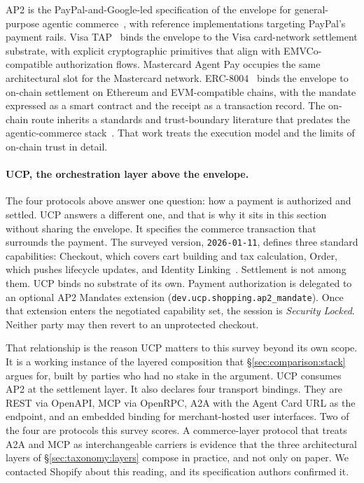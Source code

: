 AP2 is the PayPal-and-Google-led specification of the
envelope for general-purpose agentic
commerce~\cite{spec_ap2}, with reference implementations
targeting PayPal's payment rails. Visa TAP~\cite{spec_visa_tap}
binds the envelope to the Visa card-network settlement
substrate, with explicit cryptographic primitives that
align with EMVCo-compatible authorization flows.
Mastercard Agent Pay occupies the same architectural slot
for the Mastercard network. ERC-8004~\cite{spec_erc8004}
binds the envelope to on-chain settlement on Ethereum and
EVM-compatible chains, with the mandate expressed as a
smart contract and the receipt as a transaction record.
The on-chain route inherits a standards and trust-boundary
literature that predates the agentic-commerce
stack~\cite{agents_blockchain}. That work treats the
execution model and the limits of on-chain trust in detail.

\paragraph{UCP, the orchestration layer above the
envelope.} The four protocols above answer one question:
how a payment is authorized and settled. UCP answers a
different one, and that is why it sits in this section
without sharing the envelope. It specifies the commerce
transaction that surrounds the payment. The surveyed
version, \texttt{2026-01-11}, defines three standard
capabilities: Checkout, which covers cart building and tax
calculation, Order, which pushes lifecycle updates, and
Identity Linking~\cite{spec_ucp}. Settlement is not among
them. UCP binds no substrate of its own. Payment
authorization is delegated to an optional AP2 Mandates
extension (\texttt{dev.ucp.shopping.ap2\_mandate}). Once that
extension enters the negotiated capability set, the session is
\emph{Security Locked}. Neither party may then revert to an
unprotected checkout.

That relationship is the reason UCP matters to this
survey beyond its own scope. It is a working instance of
the layered composition that \S\ref{sec:comparison:stack}
argues for, built by parties who had no stake in the
argument. UCP consumes AP2 at the settlement layer. It
also declares four transport bindings. They are REST via
OpenAPI, MCP via OpenRPC, A2A with the Agent Card URL as the
endpoint, and an embedded binding for merchant-hosted user
interfaces. Two of the four are protocols this survey scores.
A commerce-layer protocol that treats A2A and MCP as
interchangeable carriers is evidence that the three
architectural layers of \S\ref{sec:taxonomy:layers}
compose in practice, and not only on paper. We contacted
Shopify about this reading, and its specification authors
confirmed it.

